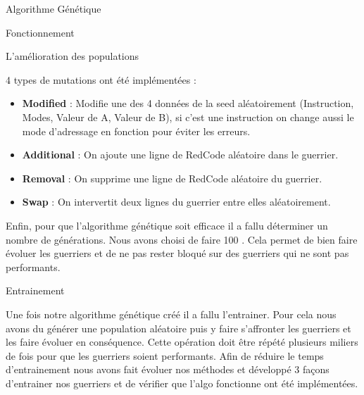 \documentclass[a4paper, 10pt]{article}
\begin{document}
\begin{section}{Algorithme Génétique}
\begin{subsection}{Fonctionnement}
\begin{subsubsection}{L'amélioration des populations}
                    \medskip
                \par
                    4 types de mutations ont été implémentées : 
                    \begin{itemize}
                        \item \textbf{Modified} : Modifie une des 4 données de la seed aléatoirement (Instruction, Modes, Valeur de A, Valeur de B), si c'est une instruction on change aussi le mode d'adressage en fonction pour éviter les erreurs.
                        \item \textbf{Additional} : On ajoute une ligne de RedCode aléatoire dans le guerrier.
                        \item \textbf{Removal} : On supprime une ligne de RedCode aléatoire du guerrier.
                        \item \textbf{Swap} : On intervertit deux lignes du guerrier entre elles aléatoirement.
                    \end{itemize}
                    \bigskip
                \par
                    Enfin, pour que l'algorithme génétique soit efficace il a fallu déterminer un nombre de générations. Nous avons choisi de faire 100 . Cela permet de bien faire évoluer les guerriers et de ne pas rester bloqué sur des guerriers qui ne sont pas performants.
                    \bigskip

            \end{subsubsection}
        \end{subsection}

        \begin{subsection}{Entrainement}
            \par
                Une fois notre algorithme génétique créé il a fallu l'entrainer. Pour cela nous avons du générer une population aléatoire puis y faire s'affronter les guerriers et les faire évoluer en conséquence. Cette opération doit être répété plusieurs miliers de fois pour que les guerriers soient performants. Afin de réduire le temps d'entrainement nous avons fait évoluer nos méthodes et développé 3 façons d'entrainer nos guerriers et de vérifier que l'algo fonctionne ont été implémentées.


\end{subsection}
\end{section}
\end{document}
